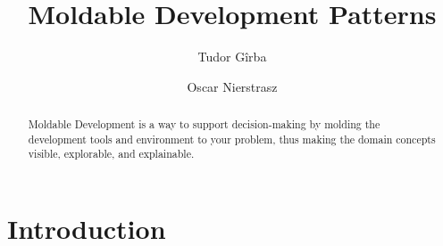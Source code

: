 \documentclass[sigconf]{acmart}
\begin{document}
\title{Moldable Development Patterns}

\author{Tudor G\^irba}

\author{Oscar Nierstrasz}

\renewcommand{\shortauthors}{G\^irba et al.}

\begin{abstract}
Moldable Development is a way to support decision-making by molding the development tools and environment to your problem, thus making the domain concepts visible, explorable, and explainable.
\end{abstract}



\maketitle

\section{Introduction}

\cite{Chis17a}




\end{document}

